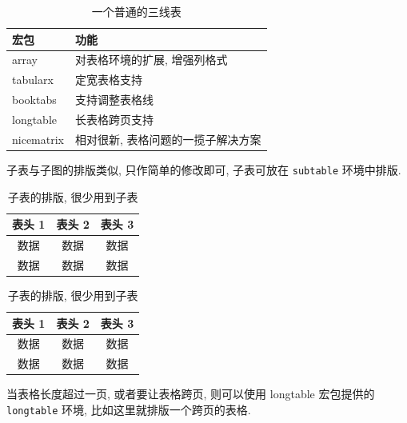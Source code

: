 \documentclass[final]{ncuthesis}
\begin{document}
\begin{table}[htb]%
\centering
\caption{一个普通的三线表}%
\label{tab:pkgs}%
\begin{tabular}{ll}
\toprule
宏包 & 功能\\
\midrule
\textsf{array}      & 对表格环境的扩展, 增强列格式\\
\textsf{tabularx}   & 定宽表格支持\\
\textsf{booktabs}   & 支持调整表格线\\
\textsf{longtable}  & 长表格跨页支持\\
\textsf{nicematrix} & 相对很新, 表格问题的一揽子解决方案\\
\bottomrule
\end{tabular}%
\end{table}

子表与子图的排版类似, 只作简单的修改即可, 子表可放在 \verb|subtable| 环境中排版. 

\begin{table}[htb]%
\centering
\caption{子表的排版, 很少用到子表}%
\begin{subtable}{.45\textwidth}%
\centering
{}%
\begin{tabular}{ccc}
\toprule
表头 1 & 表头 2 & 表头 3\\
\midrule
数据   & 数据 & 数据\\
数据   & 数据 & 数据\\
\bottomrule
\end{tabular}%
\end{subtable}%
\begin{subtable}{.45\textwidth}%
\centering
{}%
\begin{tabular}{ccc}
\toprule
表头 1 & 表头 2 & 表头 3\\
\midrule
数据   & 数据 & 数据\\
数据   & 数据 & 数据\\
\bottomrule
\end{tabular}%
\end{subtable}
\end{table}

当表格长度超过一页, 或者要让表格跨页, 则可以使用 \textsf{longtable} 宏包提供的 \verb|longtable| 环境, 比如这里就排版一个跨页的表格. 
\end{document}
